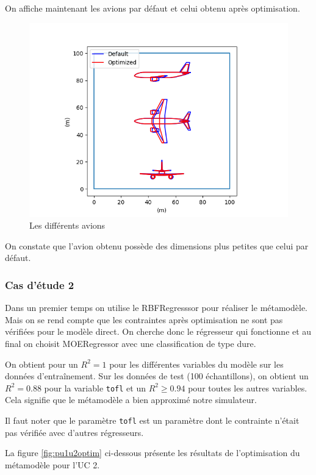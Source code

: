 \documentclass[a4paper, 11pt]{article}
\begin{document}
On affiche maintenant les avions par défaut et celui obtenu après optimisation.

\begin{figure}[H]
    \centering
    \includegraphics[width=0.8\linewidth]{Images_case_1/p1u1_plots_of_the_aircrafts.png}
    \caption{Les différents avions}
    \label{fig:p1u1avions}
\end{figure}

On constate que l'avion obtenu possède des dimensions plus petites que celui par défaut.

\subsubsection{Cas d'étude 2}

Dans un premier temps on utilise le RBFRegresssor pour réaliser le métamodèle. Mais on se rend compte que les contraintes après optimisation ne sont pas vérifiées pour le modèle direct. On cherche donc le régresseur qui fonctionne et au final on choisit MOERegressor avec une classification de type dure. \newline

On obtient pour un $R^2 = 1$ pour les différentes variables du modèle sur les données d'entraînement. Sur les données de test (100 échantillons), on obtient un $R^2 = 0.88$ pour la variable \texttt{tofl} et un $R^2 \geq 0.94 $ pour toutes les autres variables. Cela signifie que le métamodèle a bien approximé notre simulateur.\newline

Il faut noter que le paramètre \texttt{tofl} est un paramètre dont le contrainte n'était pas vérifiée avec d'autres régresseurs. \newline

La figure \ref{fig:pu1u2optim} ci-dessous présente les résultats de l'optimisation du métamodèle pour l'UC 2.
\end{document}
